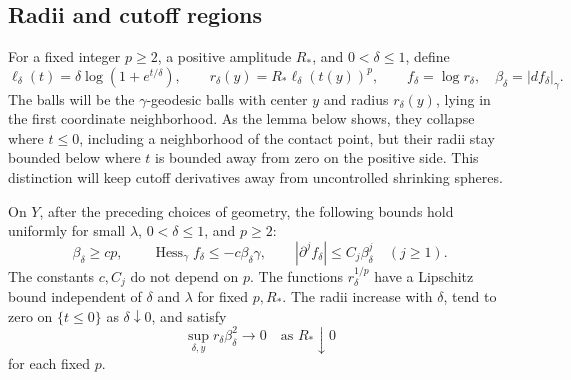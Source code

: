 \subsection{Radii and cutoff regions}

For a fixed integer $p\geq2$, a positive amplitude $R_*$, and
$0<\delta\leq1$, define
\begin{equation}\label{balls:radius}
 \ell_\delta(t)=\delta\log(1+e^{t/\delta}),\qquad
 r_\delta(y)=R_*\ell_\delta(t(y))^p,
 \qquad f_\delta=\log r_\delta,\quad
 \beta_\delta=|df_\delta|_\gamma.
\end{equation}
The balls will be the $\gamma$-geodesic balls with center $y$ and radius
$r_\delta(y)$, lying in the first coordinate neighborhood. As the lemma
below shows, they collapse where $t\le0$, including a neighborhood of
the contact point, but their radii stay bounded below where $t$ is
bounded away from zero on the positive side. This distinction will keep
cutoff derivatives away from uncontrolled shrinking spheres.

\begin{lemma}\label{balls:profiles}
On $Y$, after the preceding choices of geometry, the following bounds
hold uniformly for small $\lambda$, $0<\delta\leq1$, and $p\geq2$:
\begin{equation}\label{balls:profile-estimates}
 \beta_\delta\geq c p,\qquad
 \operatorname{Hess}_\gamma f_\delta\leq-c\beta_\delta\gamma,
 \qquad |\partial^j f_\delta|\leq C_j\beta_\delta^j
 \quad(j\geq1).
\end{equation}
The constants $c,C_j$ do not depend on $p$.  The functions
$r_\delta^{1/p}$ have a Lipschitz bound independent of $\delta$ and
$\lambda$ for fixed $p,R_*$.  The radii increase with $\delta$, tend to
zero on $\{t\leq0\}$ as $\delta\downarrow0$, and satisfy
\begin{equation}\label{balls:radius-smallness}
 \sup_{\delta,y}r_\delta\beta_\delta^2\longrightarrow0
 \quad\text{as }R_*\downarrow0
\end{equation}
for each fixed $p$.
\end{lemma}

